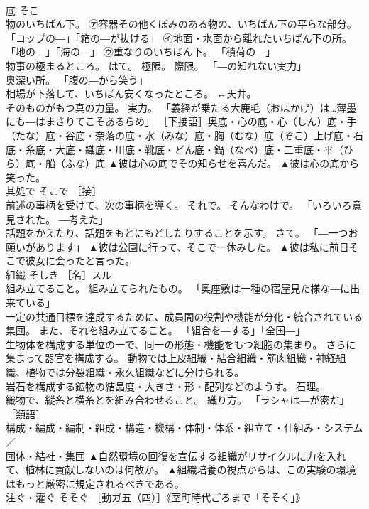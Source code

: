 \documentclass[8pt]{extreport}
\begin{document}
\begin{CJK}{UTF8}{min}
\\	底	そこ	
\\	物のいちばん下。 ㋐容器その他くぼみのある物の、いちばん下の平らな部分。 「コップの―」「箱の―が抜ける」 ㋑地面・水面から離れたいちばん下の所。 「地の―」「海の―」 ㋒重なりのいちばん下。 「積荷の―」 
\\	物事の極まるところ。 はて。 極限。 際限。 「―の知れない実力」 
\\	奥深い所。 「腹の―から笑う」 
\\	相場が下落して、いちばん安くなったところ。 ↔天井。 
\\	そのものがもつ真の力量。 実力。 「義経が乗たる大鹿毛（おほかげ）は…薄墨にも―はまさりてこそあるらめ」 ［下接語］奥底・心の底・心（しん）底・手（たな）底・谷底・奈落の底・水（みな）底・胸（むな）底（ぞこ）上げ底・石底・糸底・大底・織底・川底・靴底・どん底・鍋（なべ）底・二重底・平（ひら）底・船（ふな）底	▲彼は心の底でその知らせを喜んだ。 ▲彼は心の底から笑った。
\\	其処で	そこで	［接］ 
\\	前述の事柄を受けて、次の事柄を導く。 それで。 そんなわけで。 「いろいろ意見された。 ―考えた」 
\\	話題をかえたり、話題をもとにもどしたりすることを示す。 さて。 「―一つお願いがあります」	▲彼は公園に行って、そこで一休みした。 ▲彼は私に前日そこで彼女に会ったと言った。
\\	組織	そしき	［名］スル 
\\	組み立てること。 組み立てられたもの。 「奥座敷は一種の宿屋見た様な―に出来ている」 
\\	一定の共通目標を達成するために、成員間の役割や機能が分化・統合されている集団。 また、それを組み立てること。 「組合を―する」「全国―」 
\\	生物体を構成する単位の一で、同一の形態・機能をもつ細胞の集まり。 さらに集まって器官を構成する。 動物では上皮組織・結合組織・筋肉組織・神経組織、植物では分裂組織・永久組織などに分けられる。 
\\	岩石を構成する鉱物の結晶度・大きさ・形・配列などのようす。 石理。 
\\	織物で、縦糸と横糸とを組み合わせること。 織り方。 「ラシャは―が密だ」 ［類語］
\\	構成・編成・編制・組成・構造・機構・体制・体系・組立て・仕組み・システム／
\\	団体・結社・集団	▲自然環境の回復を宣伝する組織がリサイクルに力を入れて、植林に貢献しないのは何故か。 ▲組織培養の視点からは、この実験の環境はもっと厳密に規定されるべきである。
\\	注ぐ・灌ぐ	そそぐ	［動ガ五（四）］《室町時代ごろまで「そそく」》 

\end{CJK}
\end{document}
